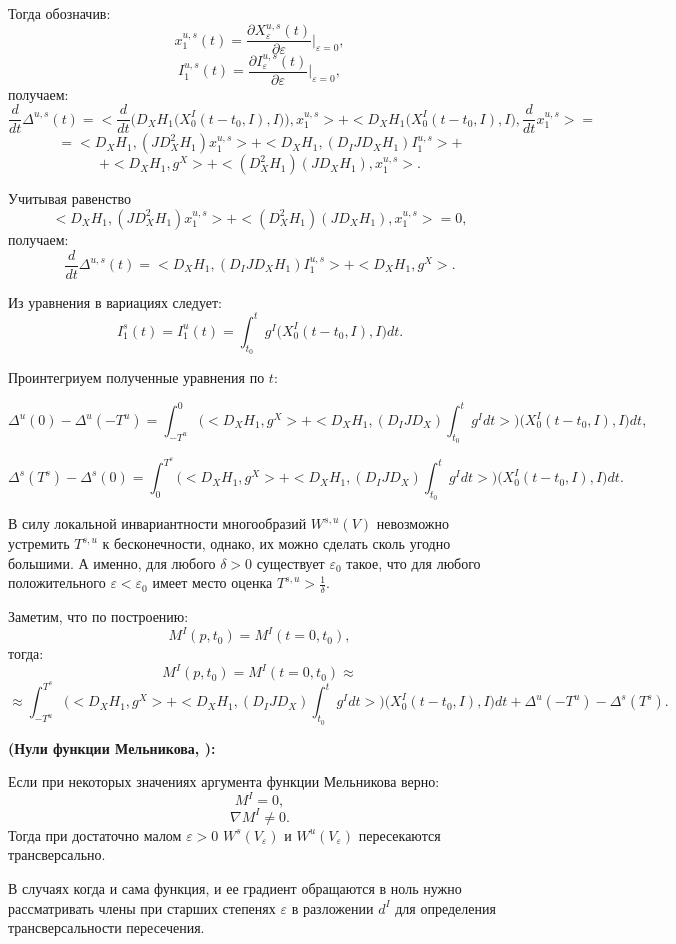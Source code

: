 Тогда обозначив:
$$x_1^{u,s}(t) = \frac{\partial X_\varepsilon^{u,s}(t)}{\partial \varepsilon}\Big|_{\varepsilon = 0},$$
$$I_1^{u,s}(t) = \frac{\partial I_\varepsilon^{u,s}(t)}{\partial \varepsilon}\Big|_{\varepsilon = 0},$$
получаем:
$$\frac{d}{dt} \Delta^{u,s}(t) = <\frac{d}{dt} \Big(D_X H_1 \big(X_0^I(t-t_0,I),I\big) \Big), x_1^{u,s}> + <D_X H_1 \big(X_0^I(t-t_0,I),I \big), \frac{d}{dt} x_1^{u,s}> = $$
$$=<D_X H_1, (J D_X^2 H_1) x_1^{u,s}> + <D_X H_1, (D_I J D_X H_1) I_1^{u,s}> + $$
$$ + <D_X H_1, g^X> + <(D_X^2 H_1)(JD_X H_1),x_1^{u,s}>.$$

Учитывая равенство
$$<D_X H_1, (J D_X^2 H_1) x_1^{u,s}> + <(D_X^2 H_1)(JD_X H_1),x_1^{u,s}> = 0,$$
получаем:
$$\frac{d}{dt} \Delta^{u,s}(t) =  <D_X H_1, (D_I J D_X H_1) I_1^{u,s}> + <D_X H_1, g^X>.$$

Из уравнения в вариациях следует:
$$I_1^s(t) = I_1^u(t) = \int_{t_0}^t g^I \big(X_0^I(t-t_0,I), I \big) dt.$$

Проинтегриуем полученные уравнения по $t$:

$$\Delta^u(0) - \Delta^u(-T^u) = \int_{-T^u}^0 \Big( <D_X H_1, g^X> + <D_X H_1, (D_I J D_X)\int_{t_0}^t g^I dt > \Big) \big(X_0^I(t-t_0,I),I \big)dt,$$

$$\Delta^s(T^s) - \Delta^s(0) = \int_{0}^{T^s} \Big( <D_X H_1, g^X> + <D_X H_1, (D_I J D_X)\int_{t_0}^t g^I dt > \Big) \big(X_0^I(t-t_0,I),I \big)dt.$$

В силу локальной инвариантности многообразий $W^{s,u}(V)$ невозможно устремить $T^{s,u}$ к бесконечности, однако, их можно сделать сколь угодно большими. А именно, для любого $\delta>0$ существует $\varepsilon_0$ такое, что для любого 
положительного $\varepsilon < \varepsilon_0$ имеет место оценка $T^{s,u}>\frac{1}{\delta}$.

Заметим, что по построению:
$$M^I(p,t_0) = M^I(t=0,t_0),$$
тогда:
$$M^I(p,t_0) = M^I(t=0,t_0) \approx $$
$$ \approx \int_{-T^u}^{T^s} \Big( <D_X H_1, g^X> + <D_X H_1, (D_I J D_X)\int_{t_0}^t g^I dt > \Big) \big(X_0^I(t-t_0,I),I \big)dt + \Delta^u(-T^u) - \Delta^s(T^s).$$


\begin{thm}
\textbf{(Нули функции Мельникова, \cite{wiggins}):}

Если при некоторых значениях аргумента функции Мельникова верно: 
$$M^I = 0,$$
$$\nabla M^I \neq 0.$$
Тогда при достаточно малом $\varepsilon > 0$ $W^s(V_\varepsilon)$ и $W^u(V_\varepsilon)$ пересекаются трансверсально.

В случаях когда и сама функция, и ее градиент обращаются в ноль нужно рассматривать члены при старших степенях $\varepsilon$ в разложении $d^I$ для определения трансверсальности пересечения.

\end{thm}